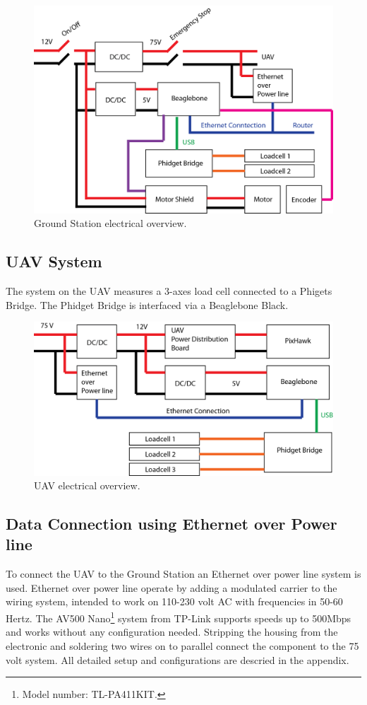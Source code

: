 \begin{figure}[hbtp]
\centering
\includegraphics[scale=0.75]{graphics/GCS-eltectrical-overview.png}
\caption{Ground Station electrical overview.}
\end{figure}


\subsection{UAV System}
The system on the UAV measures a 3-axes load cell connected to a Phigets Bridge. The Phidget Bridge is interfaced via a Beaglebone Black.  

\begin{figure}[hbtp]
\centering
\includegraphics[scale=0.75]{graphics/UAV-electrical-system.png}
\caption{UAV electrical overview.}
\end{figure}

\newpage

\subsection{Data Connection using Ethernet over Power line}
To connect the UAV to the Ground Station an Ethernet over power line system is used. Ethernet over power line operate by adding a modulated carrier to the wiring system, intended to work on 110-230 volt AC with frequencies in 50-60 Hertz. The AV500 Nano\footnote{Model number: TL-PA411KIT.} system from TP-Link supports speeds up to 500Mbps and works without any configuration needed. Stripping the housing from the electronic and soldering two wires on to parallel connect the component to the 75 volt system. All detailed setup and configurations are descried in the appendix.

